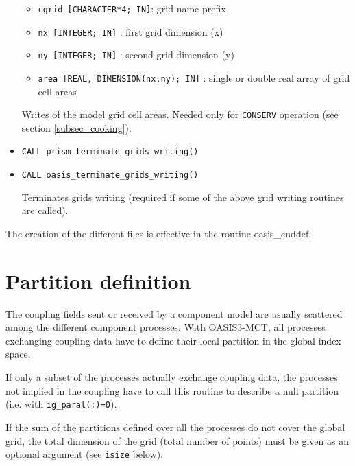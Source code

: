 \begin{itemize}
  \begin{itemize}
  \item {\tt cgrid [CHARACTER*4; IN]}: grid name prefix
  \item {\tt nx [INTEGER; IN]} : first grid dimension (x)
  \item {\tt ny [INTEGER; IN]} : second grid dimension (y)
  \item {\tt area [REAL, DIMENSION(nx,ny); IN]} : single or double real array of grid cell
    areas
  \end{itemize}
  Writes of the model grid cell areas. Needed only for {\tt CONSERV}
  operation (see section \ref{subsec_cooking}).

  \vspace{0.2cm}
\item {\tt CALL prism\_terminate\_grids\_writing()}
\item {\tt CALL oasis\_terminate\_grids\_writing()}

  Terminates grids writing (required if some of the above grid writing
  routines are called).

\end{itemize}

The creation of the different files is effective in the routine
oasis\_enddef.

\section{Partition definition}
\label{subsubsec_Partition}


The coupling fields sent or received by a component model are usually
scattered among the different component processes. With OASIS3-MCT,
all processes exchanging coupling data have to define their local
partition in the global index space.

If only a subset of the processes actually exchange coupling data, the
processes not implied in the coupling have to call this routine to
describe a null partition (i.e. with {\tt ig\_paral(:)=0}).

If the sum of the partitions defined over all the processes do not
cover the global grid, the total dimension of the grid (total number
of points) must be given as an optional argument (see {\tt isize}
below).

